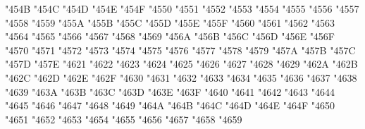 {\Uchar\jis"454B %
\Uchar\jis"454C %
\Uchar\jis"454D %
\Uchar\jis"454E %
\Uchar\jis"454F %
\Uchar\jis"4550 %
\Uchar\jis"4551 %
\Uchar\jis"4552 %
\Uchar\jis"4553 %
\Uchar\jis"4554 %
\Uchar\jis"4555 %
\Uchar\jis"4556 %
\Uchar\jis"4557 %
\Uchar\jis"4558 %
\Uchar\jis"4559 %
\Uchar\jis"455A %
\Uchar\jis"455B %
\Uchar\jis"455C %
\Uchar\jis"455D %
\Uchar\jis"455E %
\Uchar\jis"455F %
\Uchar\jis"4560 %
\Uchar\jis"4561 %
\Uchar\jis"4562 %
\Uchar\jis"4563 %
\Uchar\jis"4564 %
\Uchar\jis"4565 %
\Uchar\jis"4566 %
\Uchar\jis"4567 %
\Uchar\jis"4568 %
\Uchar\jis"4569 %
\Uchar\jis"456A %
\Uchar\jis"456B %
\Uchar\jis"456C %
\Uchar\jis"456D %
\Uchar\jis"456E %
\Uchar\jis"456F %
\Uchar\jis"4570 %
\Uchar\jis"4571 %
\Uchar\jis"4572 %
\Uchar\jis"4573 %
\Uchar\jis"4574 %
\Uchar\jis"4575 %
\Uchar\jis"4576 %
\Uchar\jis"4577 %
\Uchar\jis"4578 %
\Uchar\jis"4579 %
\Uchar\jis"457A %
\Uchar\jis"457B %
\Uchar\jis"457C %
\Uchar\jis"457D %
\Uchar\jis"457E %
\Uchar\jis"4621 %
\Uchar\jis"4622 %
\Uchar\jis"4623 %
\Uchar\jis"4624 %
\Uchar\jis"4625 %
\Uchar\jis"4626 %
\Uchar\jis"4627 %
\Uchar\jis"4628 %
\Uchar\jis"4629 %
\Uchar\jis"462A %
\Uchar\jis"462B %
\Uchar\jis"462C %
\Uchar\jis"462D %
\Uchar\jis"462E %
\Uchar\jis"462F %
\Uchar\jis"4630 %
\Uchar\jis"4631 %
\Uchar\jis"4632 %
\Uchar\jis"4633 %
\Uchar\jis"4634 %
\Uchar\jis"4635 %
\Uchar\jis"4636 %
\Uchar\jis"4637 %
\Uchar\jis"4638 %
\Uchar\jis"4639 %
\Uchar\jis"463A %
\Uchar\jis"463B %
\Uchar\jis"463C %
\Uchar\jis"463D %
\Uchar\jis"463E %
\Uchar\jis"463F %
\Uchar\jis"4640 %
\Uchar\jis"4641 %
\Uchar\jis"4642 %
\Uchar\jis"4643 %
\Uchar\jis"4644 %
\Uchar\jis"4645 %
\Uchar\jis"4646 %
\Uchar\jis"4647 %
\Uchar\jis"4648 %
\Uchar\jis"4649 %
\Uchar\jis"464A %
\Uchar\jis"464B %
\Uchar\jis"464C %
\Uchar\jis"464D %
\Uchar\jis"464E %
\Uchar\jis"464F %
\Uchar\jis"4650 %
\Uchar\jis"4651 %
\Uchar\jis"4652 %
\Uchar\jis"4653 %
\Uchar\jis"4654 %
\Uchar\jis"4655 %
\Uchar\jis"4656 %
\Uchar\jis"4657 %
\Uchar\jis"4658 %
\Uchar\jis"4659 %
}
